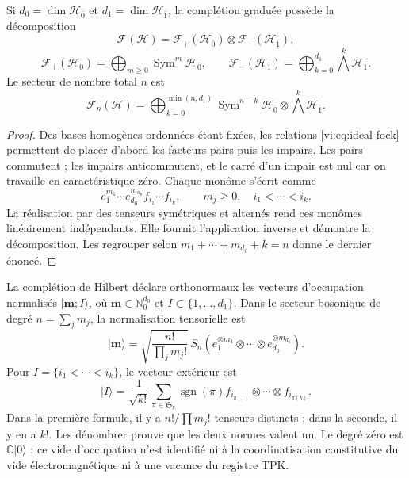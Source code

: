 \begin{theorem}
\label{vi:thm:fock-graduado}
Si \(d_0=\dim\mathcal H_{\bar0}\) et
\(d_1=\dim\mathcal H_{\bar1}\), la complétion graduée possède
la décomposition
\begin{equation}
 \mathcal F(\mathcal H)=
 \mathcal F_+(\mathcal H_{\bar0})\otimes
 \mathcal F_-(\mathcal H_{\bar1}),
 \label{vi:eq:fock-producto}
\end{equation}
\[
 \mathcal F_+(\mathcal H_{\bar0})=
 \bigoplus_{m\ge0}\operatorname{Sym}^m\mathcal H_{\bar0},
 \qquad
 \mathcal F_-(\mathcal H_{\bar1})=
 \bigoplus_{k=0}^{d_1}\bigwedge^k\mathcal H_{\bar1}.
\]
Le secteur de nombre total \(n\) est
\[
 \mathcal F_n(\mathcal H)=
 \bigoplus_{k=0}^{\min(n,d_1)}
 \operatorname{Sym}^{n-k}\mathcal H_{\bar0}
 \otimes\bigwedge^k\mathcal H_{\bar1}.
\]
\end{theorem}
\begin{proof}
Des bases homogènes ordonnées étant fixées, les relations
\eqref{vi:eq:ideal-fock} permettent de placer d’abord les facteurs pairs
puis les impairs. Les pairs commutent ; les impairs anticommutent,
et le carré d’un impair est nul car on travaille en caractéristique
zéro. Chaque monôme s’écrit comme
\[
 e_1^{m_1}\cdots e_{d_0}^{m_{d_0}}
 f_{i_1}\cdots f_{i_k},
 \qquad m_j\ge0,\quad i_1<\cdots<i_k.
\]
La réalisation par des tenseurs symétriques et alternés rend
ces monômes linéairement indépendants. Elle fournit l’application
inverse et démontre la décomposition. Les regrouper selon
\(m_1+\cdots+m_{d_0}+k=n\) donne le dernier énoncé.
\end{proof}

La complétion de Hilbert déclare orthonormaux les vecteurs
d’occupation normalisés \(|\boldsymbol m;I\rangle\), où
\(\boldsymbol m\in\mathbb N_0^{d_0}\) et
\(I\subset\{1,\ldots,d_1\}\). Dans le secteur bosonique de degré
\(n=\sum_jm_j\), la normalisation tensorielle est
\[
 |\boldsymbol m\rangle=
 \sqrt{\frac{n!}{\prod_jm_j!}}\,
 S_n(e_1^{\otimes m_1}\otimes\cdots\otimes
 e_{d_0}^{\otimes m_{d_0}}).
\]
Pour \(I=\{i_1<\cdots<i_k\}\), le vecteur extérieur est
\[
 |I\rangle=\frac1{\sqrt{k!}}\sum_{\pi\in\mathfrak S_k}
 \operatorname{sgn}(\pi)
 f_{i_{\pi(1)}}\otimes\cdots\otimes f_{i_{\pi(k)}}.
\]
Dans la première formule, il y a \(n!/\prod m_j!\) tenseurs distincts ;
dans la seconde, il y en a \(k!\). Les dénombrer prouve que les deux normes valent un.
Le degré zéro est \(\mathbb C|0\rangle\) ; ce vide d’occupation
n’est identifié ni à la coordinatisation constitutive du vide électromagnétique
ni à une vacance du registre TPK.

